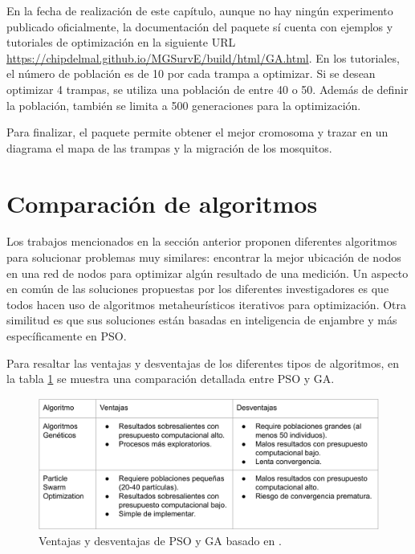 \documentclass[letterpaper]{report}
\begin{document}
    En la fecha de realización de este capítulo, aunque no hay ningún
    experimento publicado oficialmente, la documentación del paquete sí cuenta
    con ejemplos y tutoriales de optimización en la siguiente URL
    \url{https://chipdelmal.github.io/MGSurvE/build/html/GA.html}. En los
    tutoriales, el número de población es de 10 por cada trampa a optimizar. Si
    se desean optimizar 4 trampas, se utiliza una población de entre 40 o 50.
    Además de definir la población, también se limita a 500 generaciones para
    la optimización.

    Para finalizar, el paquete permite obtener el mejor cromosoma y trazar en un
    diagrama el mapa de las trampas y la migración de los mosquitos.

\section{Comparación de algoritmos}
  \label{section:analisis}
  Los trabajos mencionados en la sección anterior proponen diferentes algoritmos
  para solucionar problemas muy similares: encontrar la mejor ubicación de nodos
  en una red de nodos para optimizar algún resultado de una medición. Un aspecto
  en común de las soluciones propuestas por los diferentes investigadores es que
  todos hacen uso de algoritmos metaheurísticos iterativos para optimización.
  Otra similitud es que sus soluciones están basadas en inteligencia de enjambre
  y más específicamente en PSO. 

  Para resaltar las ventajas y desventajas de los diferentes tipos de
  algoritmos, en la tabla \ref{table:pso-ga-pros-cons} se muestra una
  comparación detallada entre PSO y GA.

  \begin{figure}[ht!]
    \includegraphics[width=\textwidth]{pso-ga-pros-cons.png}
    \caption{Ventajas y desventajas de PSO y GA basado en
      \cite{DE&PSOCov, SwarmVsEvol}.}
    \label{table:pso-ga-pros-cons}
  \end{figure}
\end{document}
